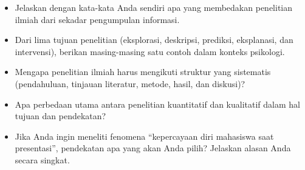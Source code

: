 \documentclass[
  indonesian,
  letterpaper,
  DIV=11,
  numbers=noendperiod]{scrreprt}
\providecommand{\tightlist}{%
  \setlength{\itemsep}{0pt}\setlength{\parskip}{0pt}}
\begin{document}
\begin{tcolorbox}[enhanced jigsaw, colframe=quarto-callout-important-color-frame, toptitle=1mm, breakable, leftrule=.75mm, arc=.35mm, toprule=.15mm, colback=white, colbacktitle=quarto-callout-important-color!10!white, bottomtitle=1mm, bottomrule=.15mm, titlerule=0mm, title=\textcolor{quarto-callout-important-color}{\faExclamation}\hspace{0.5em}{Refleksi \& Diskusi}, coltitle=black, left=2mm, opacitybacktitle=0.6, opacityback=0, rightrule=.15mm]

\begin{itemize}
\tightlist
\item
  Jelaskan dengan kata-kata Anda sendiri apa yang membedakan penelitian
  ilmiah dari sekadar pengumpulan informasi.
\item
  Dari lima tujuan penelitian (eksplorasi, deskripsi, prediksi,
  eksplanasi, dan intervensi), berikan masing-masing satu contoh dalam
  konteks psikologi.
\item
  Mengapa penelitian ilmiah harus mengikuti struktur yang sistematis
  (pendahuluan, tinjauan literatur, metode, hasil, dan diskusi)?
\item
  Apa perbedaan utama antara penelitian kuantitatif dan kualitatif dalam
  hal tujuan dan pendekatan?
\item
  Jika Anda ingin meneliti fenomena ``kepercayaan diri mahasiswa saat
  presentasi'', pendekatan apa yang akan Anda pilih? Jelaskan alasan
  Anda secara singkat.
\end{itemize}

\end{tcolorbox}
\end{document}
